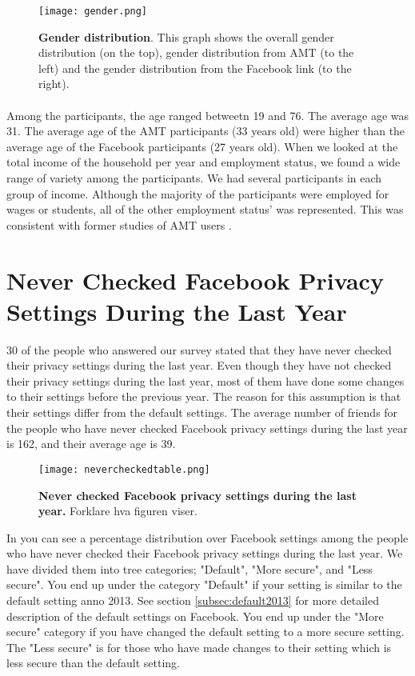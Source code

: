 \begin{figure}[h!]
\centering
\texttt{[image: gender.png]}
\caption[Gender distribution]{\textbf{Gender distribution}. This graph shows the overall gender distribution (on the top), gender distribution from AMT (to the left) and the gender distribution from the Facebook link (to the right).} 
\label{fig:gender}
\end{figure}
 
\paragraph{}
Among the participants, the age ranged betweetn 19 and 76. The average age was 31. The average age of the AMT participants (33 years old) were higher than the average age of the Facebook participants (27 years old). When we looked at the total income of the household per year and employment status, we found a wide range of variety among the participants. We had several participants in each group of income. Although the majority of the participants were employed for wages or students, all of the other employment status' was represented. This was consistent with former studies of AMT users \cite{incentivesAmt}. 


\section{Never Checked Facebook Privacy Settings During the Last Year}

30 of the people who answered our survey stated that they have never checked their privacy settings during the last year. Even though they have not checked their privacy settings during the last year, most of them have done some changes to their settings before the previous year. The reason for this assumption is that their settings differ from the default settings.  
The average number of friends for the people who have never checked Facebook privacy settings during the last year is 162, and their average age is 39. 

\begin{figure}[h!]
\centering
\texttt{[image: nevercheckedtable.png]}
\caption[Never checked Facebook privacy settings during the last year]{\textbf{Never checked Facebook privacy settings during the last year.} Forklare hva figuren viser.} 
\label{fig:neverchecked}
\end{figure}

In  you can see a percentage distribution over Facebook settings among the people who have never checked their Facebook privacy settings during the last year. We have divided them into tree categories; "Default", "More secure", and "Less secure". You end up under the category "Default" if your setting is similar to the default setting anno 2013. See section \ref{subsec:default2013} for more detailed description of the default settings on Facebook. You end up under the "More secure" category if you have changed the default setting to a more secure setting. The "Less secure" is for those who have made changes to their setting which is less secure than the default setting. 

